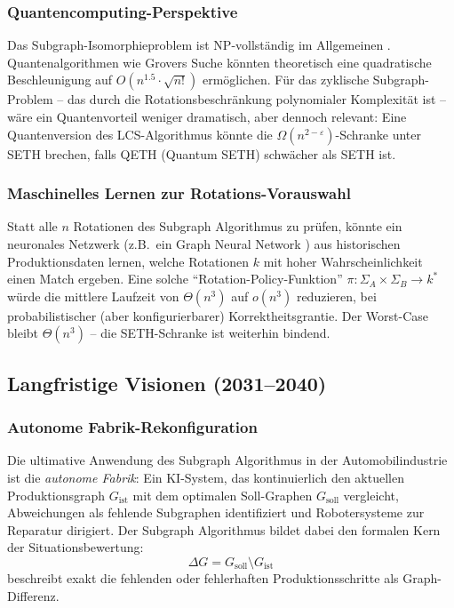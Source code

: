 ﻿\documentclass[a4paper,12pt]{article}
\theoremstyle{definition}
\begin{document}
\subsubsection{Quantencomputing-Perspektive}

Das Subgraph-Isomorphieproblem ist NP-vollständig im Allgemeinen \cite{cook1971complexity}.
Quantenalgorithmen wie Grovers Suche \cite{grover1996fast} könnten theoretisch eine
quadratische Beschleunigung auf $O(n^{1.5} \cdot \sqrt{n!})$ ermöglichen. Für das
zyklische Subgraph-Problem -- das durch die Rotationsbeschränkung polynomialer Komplexität
ist -- wäre ein Quantenvorteil weniger dramatisch, aber dennoch relevant:
Eine Quantenversion des LCS-Algorithmus könnte die $\Omega(n^{2-\varepsilon})$-Schranke
unter SETH brechen, falls QETH (Quantum SETH) schwächer als SETH ist.

\subsubsection{Maschinelles Lernen zur Rotations-Vorauswahl}

Statt alle $n$ Rotationen des Subgraph Algorithmus zu prüfen, könnte ein neuronales Netzwerk
(z.B.\ ein Graph Neural Network \cite{wu2020gnn}) aus historischen Produktionsdaten lernen,
welche Rotationen $k$ mit hoher Wahrscheinlichkeit einen Match ergeben. Eine solche
``Rotation-Policy-Funktion'' $\pi: \Sigma_A \times \Sigma_B \to k^*$ würde die mittlere
Laufzeit von $\Theta(n^3)$ auf $o(n^3)$ reduzieren, bei probabilistischer (aber konfigurierbarer)
Korrektheitsgrantie. Der Worst-Case bleibt $\Theta(n^3)$ -- die SETH-Schranke ist weiterhin bindend.

\subsection{Langfristige Visionen (2031--2040)}

\subsubsection{Autonome Fabrik-Rekonfiguration}

Die ultimative Anwendung des Subgraph Algorithmus in der Automobilindustrie ist die
\emph{autonome Fabrik}: Ein KI-System, das kontinuierlich den aktuellen Produktionsgraph
$G_{\mathrm{ist}}$ mit dem optimalen Soll-Graphen $G_{\mathrm{soll}}$ vergleicht,
Abweichungen als fehlende Subgraphen identifiziert und Robotersysteme zur Reparatur dirigiert.
Der Subgraph Algorithmus bildet dabei den formalen Kern der Situationsbewertung:
\[
\Delta G = G_{\mathrm{soll}} \setminus G_{\mathrm{ist}}
\]
beschreibt exakt die fehlenden oder fehlerhaften Produktionsschritte als Graph-Differenz.
\end{document}
